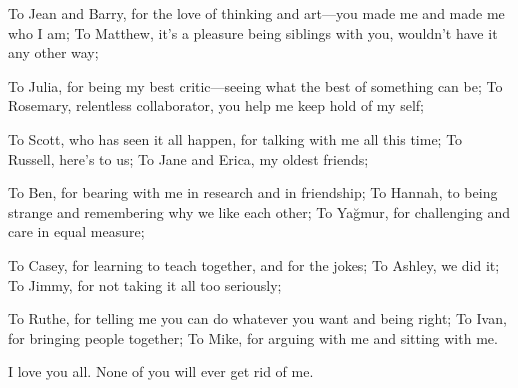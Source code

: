 \documentclass{ucetd}
\begin{document}
To Jean and Barry, for the love of thinking and art—you made me and made me who I am; To Matthew, it's a pleasure being siblings with you, wouldn't have it any other way;

To Julia, for being my best critic—seeing what the best of something can be; To Rosemary, relentless collaborator, you help me keep hold of my self;

To Scott, who has seen it all happen, for talking with me all this time; To Russell, here's to us; To Jane and Erica, my oldest friends;

To Ben, for bearing with me in research and in friendship; To Hannah, to being strange and remembering why we like each other; To Ya\u{g}mur, for challenging and care in equal measure; 

To Casey, for learning to teach together, and for the jokes; To Ashley, we did it; To Jimmy, for not taking it all too seriously;

To Ruthe, for telling me you can do whatever you want and being right; To Ivan, for bringing people together; To Mike, for arguing with me and sitting with me.

I love you all. None of you will ever get rid of me.
\end{document}
